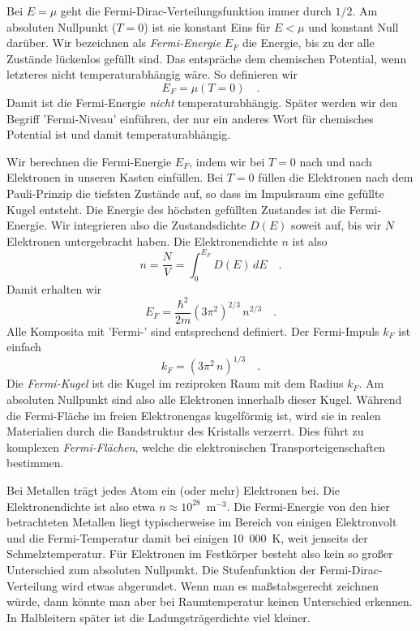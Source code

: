 Bei $E = \mu$ geht die Fermi-Dirac-Verteilungsfunktion immer durch $1/2$. Am absoluten Nullpunkt ($T=0$) ist sie konstant Eins für $E < \mu$ und konstant Null darüber. Wir bezeichnen als \emph{Fermi-Energie} $E_F$ die Energie, bis zu der alle Zustände lückenlos gefüllt sind. Das entspräche dem chemischen Potential, wenn letzteres nicht temperaturabhängig wäre. So definieren wir
\begin{equation}
    E_F = \mu (T = 0) \quad .
\end{equation}
Damit ist die Fermi-Energie \emph{nicht} temperaturabhängig. Später werden wir den Begriff 'Fermi-Niveau' einführen, der nur ein anderes Wort für chemisches Potential ist und damit temperaturabhängig.


Wir berechnen die Fermi-Energie $E_F$, indem wir bei $T=0$ nach und nach Elektronen in unseren Kasten einfüllen.
Bei $T=0$ füllen die Elektronen nach dem Pauli-Prinzip die tiefsten Zustände auf, so dass im Impulsraum eine gefüllte Kugel entsteht. Die Energie des höchsten gefüllten Zustandes ist die Fermi-Energie.
Wir integrieren also die Zustandsdichte $D(E)$ soweit auf, bis wir $N$ Elektronen untergebracht haben. Die Elektronendichte $n$ ist also
\begin{equation}
    n = \frac{N}{V} = \int_0^{E_F} D(E) \, dE \quad .
\end{equation}
Damit erhalten wir
\begin{equation}
    E_F = \frac{\hbar^2}{2m} (3 \pi^2)^{2/3} \, n^{2/3} \quad .
\end{equation}
Alle Komposita mit 'Fermi-' sind entsprechend definiert. Der Fermi-Impuls $k_F$ ist einfach
\begin{equation}
    k_F = (3 \pi^2 \, n)^{1/3} \quad .
\end{equation}
Die \emph{Fermi-Kugel} ist die Kugel im reziproken Raum mit dem Radius $k_F$. Am absoluten Nullpunkt sind also alle Elektronen innerhalb dieser Kugel. Während die Fermi-Fläche im freien Elektronengas kugelförmig ist, wird sie in realen Materialien durch die Bandstruktur des Kristalls verzerrt. Dies führt zu komplexen \emph{Fermi-Flächen}, welche die elektronischen Transporteigenschaften bestimmen.


Bei Metallen trägt jedes Atom ein (oder mehr) Elektronen bei. Die Elektronendichte ist also etwa $n \approx 10^{28}$~m$^{-3}$.
Die Fermi-Energie von den hier betrachteten Metallen liegt typischerweise im Bereich von einigen Elektronvolt und die Fermi-Temperatur damit bei einigen 10~000~K, weit jenseits der Schmelztemperatur. Für Elektronen im Festkörper besteht also kein so großer Unterschied zum absoluten Nullpunkt. Die Stufenfunktion der Fermi-Dirac-Verteilung wird etwas abgerundet. Wenn man es maßstabsgerecht zeichnen würde, dann könnte man aber bei Raumtemperatur keinen Unterschied erkennen. In Halbleitern später ist die Ladungsträgerdichte viel kleiner.


